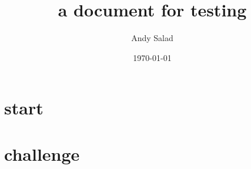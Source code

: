 \documentclass[a4paper,beeees]{hwhProblem}
\begin{document}
\title{a document for testing}
\author{Andy Salad}
\date{\today}
\section{start}
\lipsum[1-2]
\section{challenge}
\lipsum[3-4]
\end{document}
